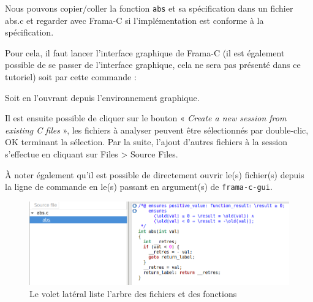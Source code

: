 \documentclass[12pt,francais,]{scrbook}
\newenvironment{Shaded}{}{}
\newcommand{\KeywordTok}[1]{\textcolor[rgb]{0.00,0.44,0.13}{\textbf{{#1}}}}
\newcommand{\NormalTok}[1]{{#1}}
\begin{document}
Nous pouvons copier/coller la fonction \texttt{abs} et sa spécification
dans un fichier abs.c et regarder avec Frama-C si l'implémentation est
conforme à la spécification.

Pour cela, il faut lancer l'interface graphique de Frama-C (il est
également possible de se passer de l'interface graphique, cela ne sera
pas présenté dans ce tutoriel) soit par cette commande :

\begin{footnotesize}\begin{Shaded}
\end{Shaded}\end{footnotesize}

Soit en l'ouvrant depuis l'environnement graphique.

Il est ensuite possible de cliquer sur le bouton « \emph{Create a new
session from existing C files} », les fichiers à analyser peuvent être
sélectionnés par double-clic, OK terminant la sélection. Par la suite,
l'ajout d'autres fichiers à la session s'effectue en cliquant sur Files
\textgreater{} Source Files.

À noter également qu'il est possible de directement ouvrir le(s)
fichier(s) depuis la ligne de commande en le(s) passant en argument(s)
de \texttt{frama-c-gui}.

\begin{footnotesize}\begin{Shaded}
\end{Shaded}\end{footnotesize}

\begin{figure}[htbp]
\centering
\includegraphics[scale=0.5]{2-1-1-abs-1.png}
\caption{Le volet latéral liste l'arbre des fichiers et des fonctions}
\label{fig:2-1-1-abs-1}
\end{figure}
\end{document}
